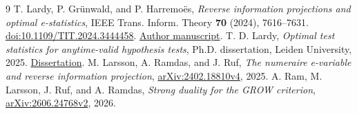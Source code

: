 \documentclass[11pt,a4paper]{amsart}
\begin{document}
\begin{thebibliography}{9}
T. Lardy, P. Gr\"unwald, and P. Harremo\"es, \emph{Reverse information projections and optimal e-statistics}, IEEE Trans. Inform. Theory \textbf{70} (2024), 7616--7631. \href{https://doi.org/10.1109/TIT.2024.3444458}{doi:10.1109/TIT.2024.3444458}. \href{https://ir.cwi.nl/pub/34437/34437.pdf}{Author manuscript}.
T. D. Lardy, \emph{Optimal test statistics for anytime-valid hypothesis tests}, Ph.D. dissertation, Leiden University, 2025. \href{https://ir.cwi.nl/pub/35219/ThesisLardy.pdf}{Dissertation}.
M. Larsson, A. Ramdas, and J. Ruf, \emph{The numeraire e-variable and reverse information projection}, \href{https://arxiv.org/abs/2402.18810v4}{arXiv:2402.18810v4}, 2025.
A. Ram, M. Larsson, J. Ruf, and A. Ramdas, \emph{Strong duality for the GROW criterion}, \href{https://arxiv.org/abs/2606.24768v2}{arXiv:2606.24768v2}, 2026.
\end{thebibliography}
\end{document}
